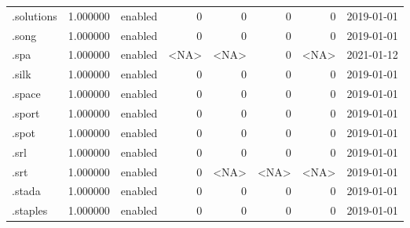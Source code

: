 \begin{tabular}{lrlrrrrl}
.solutions                &          1.000000 &         enabled &                           0 &                           0 &                           0 &                   0 &           2019-01-01 \\
.song                     &          1.000000 &         enabled &                           0 &                           0 &                           0 &                   0 &           2019-01-01 \\
.spa                      &          1.000000 &         enabled &                        <NA> &                        <NA> &                           0 &                <NA> &           2021-01-12 \\
.silk                     &          1.000000 &         enabled &                           0 &                           0 &                           0 &                   0 &           2019-01-01 \\
.space                    &          1.000000 &         enabled &                           0 &                           0 &                           0 &                   0 &           2019-01-01 \\
.sport                    &          1.000000 &         enabled &                           0 &                           0 &                           0 &                   0 &           2019-01-01 \\
.spot                     &          1.000000 &         enabled &                           0 &                           0 &                           0 &                   0 &           2019-01-01 \\
.srl                      &          1.000000 &         enabled &                           0 &                           0 &                           0 &                   0 &           2019-01-01 \\
.srt                      &          1.000000 &         enabled &                           0 &                        <NA> &                        <NA> &                <NA> &           2019-01-01 \\
.stada                    &          1.000000 &         enabled &                           0 &                           0 &                           0 &                   0 &           2019-01-01 \\
.staples                  &          1.000000 &         enabled &                           0 &                           0 &                           0 &                   0 &           2019-01-01 \\

\end{tabular}
